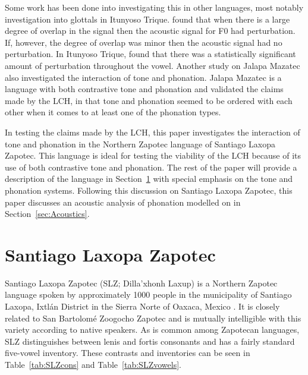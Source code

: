 \documentclass[12pt, letterpaper]{article}
\begin{document}
Some work has been done into investigating this in other languages, most notably  investigation into glottals in Itunyoso Trique. \citeauthor{dicanioCoarticulationToneGlottal2012} found that when there is a large degree of overlap in the signal then the acoustic signal for F0 had perturbation. If, however, the degree of overlap was minor then the acoustic signal had no perturbation. In Itunyoso Trique, \citeauthor{dicanioCoarticulationToneGlottal2012} found that there was a statistically significant amount of perturbation throughout the vowel. Another study on Jalapa Mazatec \citep{garellekAcousticConsequencesPhonation2011} also investigated the interaction of tone and phonation. Jalapa Mazatec is a language with both contrastive tone and phonation and \citet{garellekAcousticConsequencesPhonation2011} validated the claims made by the LCH, in that tone and phonation seemed to be ordered with each other when it comes to at least one of the phonation types.

In testing the claims made by the LCH, this paper investigates the interaction of tone and phonation in the Northern Zapotec language of Santiago Laxopa Zapotec. This language is ideal for testing the viability of the LCH because of its use of both contrastive tone and phonation. The rest of the paper will provide a description of the language in Section~\ref{sec:SLZ} with special emphasis on the tone and phonation systems. Following this discussion on Santiago Laxopa Zapotec, this paper discusses an acoustic analysis of phonation modelled on \citet{espositoVariationContrastivePhonation2010,garellekAcousticConsequencesPhonation2011,dicanioCoarticulationToneGlottal2012} in Section~\ref{sec:Acoustics}.

\section{Santiago Laxopa Zapotec} \label{sec:SLZ}

Santiago Laxopa Zapotec (SLZ; Dilla'xhonh Laxup) is a Northern Zapotec language spoken by approximately 1000 people in the municipality of Santiago Laxopa, Ixtlán District in the Sierra Norte of Oaxaca, Mexico \citep{adlerAcousticsPhonationTypes2016,adlerDerivationVerbInitiality2018,foleyForbiddenCliticClusters2018,foleyExtendingPersonCaseConstraint2020}. It is closely related to San Bartolomé Zoogocho Zapotec \citep{longDiccionarioZapotecoSan2005,sonnenscheinDescriptiveGrammarSan2005} and is mutually intelligible with this variety according to native speakers.  As is common among Zapotecan languages, SLZ distinguishes between lenis and fortis consonants \citep[e.g.,][]{nellisFortisLenisCajonos1980,jaegerFortisLenisQuestion1983,uchiharaFortisLenisGlides2016} and has a fairly standard five-vowel inventory. These contrasts and inventories can be seen in Table~\ref{tab:SLZcons} and Table~\ref{tab:SLZvowels}.
\end{document}
